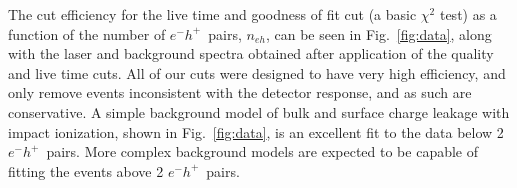 \documentclass[%
reprint,
superscriptaddress,
preprintnumbers,
amsmath,amssymb,
prl,
aps,
floatfix
]{revtex4-1}
\newcommand{\eh}{$e^-h^+$}
\begin{document}
The cut efficiency for the live time and goodness of fit cut (a basic $\chi^2$ test) as a function of the number of \eh\ pairs, $n_{eh}$, can be seen in Fig.~\ref{fig:data}, along with the laser and background spectra obtained after application of the quality and live time cuts. All of our cuts were designed to have very high efficiency, and only remove events inconsistent with the detector response, and as such are conservative. A simple background model of bulk and surface charge leakage with impact ionization, shown in Fig.~\ref{fig:data}, is an excellent fit to the data below 2 \eh\ pairs. More complex background models are expected to be capable of fitting the events above 2 \eh\ pairs.

\end{document}
